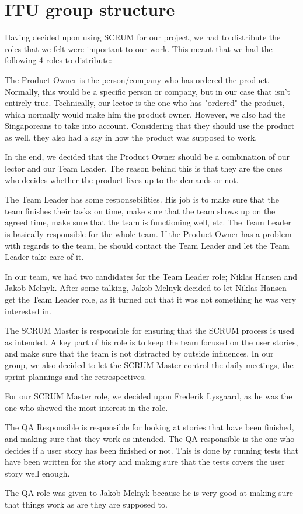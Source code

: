 \section{ITU group structure}
\label{Collaboration_ITU}
Having decided upon using SCRUM for our project, we had to distribute the roles that we felt were important to our work. This meant that we had the following 4 roles to distribute:
\begin{my_description}
\item[Product Owner]
The Product Owner is the person/company who has ordered the product. Normally, this would be a specific person or company, but in our case that isn't entirely true. Technically, our lector is the one who has "ordered" the product, which normally would make him the product owner. However, we also had the Singaporeans to take into account. Considering that they should use the product as well, they also had a say in how the product was supposed to work.

In the end, we decided that the Product Owner should be a combination of our lector and our Team Leader. The reason behind this is that they are the ones who decides whether the product lives up to the demands or not.

\item[Team Leader]
The Team Leader has some responsebilities. His job is to make sure that the team finishes their tasks on time, make sure that the team shows up on the agreed time, make sure that the team is functioning well, etc. The Team Leader is basically responsible for the whole team. If the Product Owner has a problem with regards to the team, he should contact the Team Leader and let the Team Leader take care of it.

In our team, we had two candidates for the Team Leader role; Niklas Hansen and Jakob Melnyk. After some talking, Jakob Melnyk decided to let Niklas Hansen get the Team Leader role, as it turned out that it was not something he was very interested in.

\item[SCRUM Master]
The SCRUM Master is responsible for ensuring that the SCRUM process is used as intended. A key part of his role is to keep the team focused on the user stories, and make sure that the team is not distracted by outside influences. In our group, we also decided to let the SCRUM Master control the daily meetings, the sprint plannings and the retrospectives.

For our SCRUM Master role, we decided upon Frederik Lysgaard, as he was the one who showed the most interest in the role.

\item[QA Responsible]
The QA Responsible is responsible for looking at stories that have been finished, and making sure that they work as intended. The QA responsible is the one who decides if a user story has been finished or not. This is done by running tests that have been written for the story and making sure that the tests covers the user story well enough.

The QA role was given to Jakob Melnyk because he is very good at making sure that things work as are they are supposed to.
\end{my_description}

